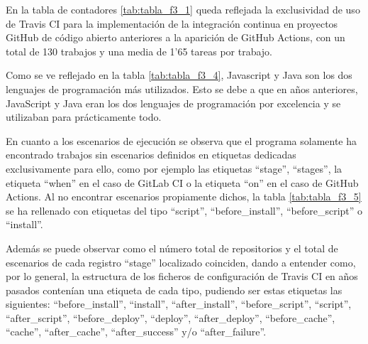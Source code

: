 En la tabla de contadores \ref{tab:tabla_f3_1} queda reflejada la exclusividad de uso de Travis CI para la implementación de la integración continua en proyectos GitHub de código abierto anteriores a la aparición de GitHub Actions, con un total de 130 trabajos y una media de 1'65 tareas por trabajo.

Como se ve reflejado en la tabla \ref{tab:tabla_f3_4}, Javascript y Java son los dos lenguajes de programación más utilizados. Esto se debe a que en años anteriores, JavaScript y Java eran los dos lenguajes de programación por excelencia y se utilizaban para prácticamente todo.

En cuanto a los escenarios de ejecución se observa que el programa solamente ha encontrado trabajos sin escenarios definidos en etiquetas dedicadas exclusivamente para ello, como por ejemplo las etiquetas ``stage'', ``stages'', la etiqueta ``when'' en el caso de GitLab CI o la etiqueta ``on'' en el caso de GitHub Actions. Al no encontrar escenarios propiamente dichos, la tabla \ref{tab:tabla_f3_5} se ha rellenado con etiquetas del tipo ``script'', ``before\_install'', ``before\_script'' o ``install''.

Además se puede observar como el número total de repositorios y el total de escenarios de cada registro ``stage'' localizado coinciden, dando a entender como, por lo general, la estructura de los ficheros de configuración de Travis CI en años pasados contenían una etiqueta de cada tipo, pudiendo ser estas etiquetas las siguientes: ``before\_install'', ``install'', ``after\_install'', ``before\_script'', ``script'', ``after\_script'', ``before\_deploy'', ``deploy'', ``after\_deploy'', ``before\_cache'', ``cache'', ``after\_cache'', ``after\_success'' y/o ``after\_failure''.